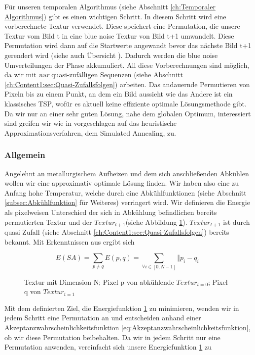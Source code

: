 Für unseren temporalen Algorithmus (siehe Abschnitt \ref{ch:Temporaler Algorithmus}) gibt es einen 
wichtigen  Schritt.
In diesem Schritt wird eine vorberechnete Textur verwendet. Diese speichert eine
Permutation, die unsere  Textur vom Bild t in eine
blue noise Textur von Bild t+1 umwandelt. Diese Permutation wird 
dann auf die Startwerte angewandt bevor das nächste Bild t+1 gerendert wird (siehe auch Übersicht ).
Dadurch werden die blue noise Umverteilungen der  Phase akkumuliert. 
All diese Vorberechnungen sind möglich, da wir mit \textit{\glqq nur\grqq} quasi-zufälligen Sequenzen 
(siehe Abschnitt \ref{ch:Content1:sec:Quasi-Zufallsfolgen}) arbeiten.
Das andauernde Permutieren von Pixeln bis zu einem Punkt, an dem ein Bild aussieht wie das Andere ist 
ein klassisches TSP, wofür es aktuell keine effiziente optimale Lösungsmethode gibt.
Da wir nur an einer sehr guten Lösung, nahe dem globalen Optimum, interessiert sind 
greifen wir wie in \cite{hal02158423} vorgeschlagen auf das heuristische Approximationsverfahren,
dem Simulated Annealing, zu.

\subsubsection{Allgemein}

Angelehnt an metallurgischem Aufheizen und dem sich anschließenden Abkühlen wollen wir eine approximativ
optimale Lösung finden. Wir haben also eine zu Anfang hohe Temperatur, welche durch eine Abkühlfunktionen
(siehe Abschnitt \ref{subsec:Abkühlfunktion} für Weiteres) verringert wird.
Wir definieren die Energie als pixelweisen Unterschied der sich in Abkühlung 
befindlichen bereits permutierten Textur und der $Textur_{t+1}$(siehe Abbildung \ref{eq:pixel energy function}). 
$Textur_{t+1}$ ist durch quasi Zufall (siehe Abschnitt \ref{ch:Content1:sec:Quasi-Zufallsfolgen}) bereits bekannt.
Mit Erkenntnissen aus\cite{georgiev2016blue} ergibt sich

\begin{figure}[H]
  \[ E(SA) = \sum_{p \neq q}E(p,q) = \sum_{\forall i \in [0,N-1]} \Vert{p_{i}-q_{i}}\Vert \]
  \caption{ Textur mit Dimension N; Pixel p von abkühlende 
  $Textur_{t=0}$; Pixel q von $Textur_{t=1}$}
  \label{eq:pixel energy function}
\end{figure}

Mit dem definierten Ziel, die Energiefunktion \ref{eq:pixel energy function} zu minimieren, wenden 
wir in jedem Schritt eine Permutation an und entscheiden anhand einer Akzeptanzwahrscheinlichkeitsfunktion
\ref{eq:Akzeptanzwahrscheinlichkeitsfunktion}, ob wir diese Permutation beibehalten.
Da wir in jedem Schritt nur eine Permutation anwenden, vereinfacht sich unsere Energiefunktion
\ref{eq:pixel energy function} zu 

